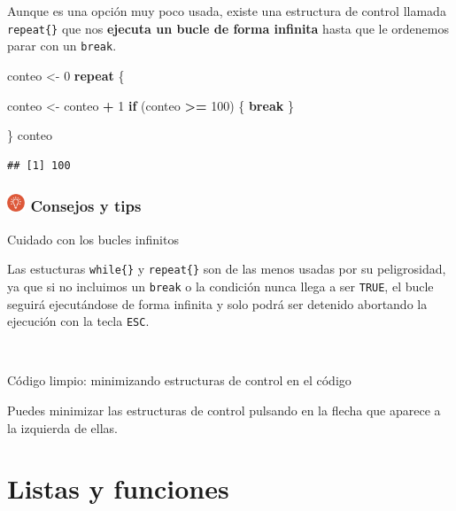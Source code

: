 \documentclass[11pt,]{book}
\newenvironment{Shaded}{\begin{snugshade}}{\end{snugshade}}
\newcommand{\ControlFlowTok}[1]{\textcolor[rgb]{0.27,0.27,0.27}{\textbf{#1}}}
\newcommand{\DecValTok}[1]{\textcolor[rgb]{0.06,0.06,0.06}{#1}}
\newcommand{\NormalTok}[1]{#1}
\newcommand{\OperatorTok}[1]{\textcolor[rgb]{0.43,0.43,0.43}{\textbf{#1}}}
\newcommand{\StringTok}[1]{\textcolor[rgb]{0.5,0.5,0.5}{#1}}
\begin{document}
Aunque es una opción muy poco usada, existe una estructura de control llamada \texttt{repeat\{\}} que nos \textbf{ejecuta un bucle de forma infinita} hasta que le ordenemos parar con un \texttt{break}.

\begin{Shaded}
\begin{Highlighting}[]
\NormalTok{conteo <-}\StringTok{ }\DecValTok{0}
\ControlFlowTok{repeat}\NormalTok{ \{ }
  
\NormalTok{  conteo <-}\StringTok{ }\NormalTok{conteo }\OperatorTok{+}\StringTok{ }\DecValTok{1}
  \ControlFlowTok{if}\NormalTok{ (conteo }\OperatorTok{>=}\StringTok{ }\DecValTok{100}\NormalTok{) \{ }\ControlFlowTok{break}\NormalTok{ \}}
  
\NormalTok{\}}
\NormalTok{conteo}
\end{Highlighting}
\end{Shaded}

\begin{verbatim}
## [1] 100
\end{verbatim}

\hypertarget{consejos-y-tips-6}{%
\section[ Consejos y tips]{\texorpdfstring{\protect\includegraphics[width=0.04\textwidth,height=\textheight]{img/logo_info.png} Consejos y tips}{ Consejos y tips}}\label{consejos-y-tips-6}}

Cuidado con los bucles infinitos

Las estucturas \texttt{while\{\}} y \texttt{repeat\{\}} son de las menos usadas por su peligrosidad, ya que si no incluimos un \texttt{break} o la condición nunca llega a ser \texttt{TRUE}, el bucle seguirá ejecutándose de forma infinita y solo podrá ser detenido abortando la ejecución con la tecla \texttt{ESC}.

~

Código limpio: minimizando estructuras de control en el código

Puedes minimizar las estructuras de control pulsando en la flecha que aparece a la izquierda de ellas.

\hypertarget{part-listas-y-funciones}{%
\part{Listas y funciones}\label{part-listas-y-funciones}}
\end{document}
